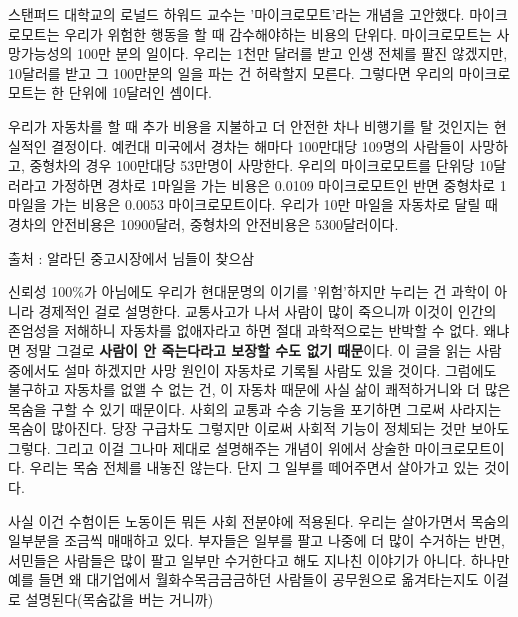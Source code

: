 \vspace{5mm}

스탠퍼드 대학교의 로널드 하워드 교수는 '마이크로모트'라는 개념을 고안했다.
마이크로모트는 우리가 위험한 행동을 할 때 감수해야하는 비용의 단위다.
마이크로모트는 사망가능성의 100만 분의 일이다.
우리는 1천만 달러를 받고 인생 전체를 팔진 않겠지만, 10달러를 받고 그 100만분의 일을 파는 건 허락할지 모른다.
그렇다면 우리의 마이크로모트는 한 단위에 10달러인 셈이다.
\vspace{5mm}

우리가 자동차를 할 때 추가 비용을 지불하고 더 안전한 차나 비행기를 탈 것인지는 현실적인 결정이다.
예컨대 미국에서 경차는 해마다 100만대당 109명의 사람들이 사망하고, 중형차의 경우 100만대당 53만명이 사망한다.
우리의 마이크로모트를 단위당 10달러라고 가정하면
경차로 1마일을 가는 비용은 0.0109 마이크로모트인 반면
중형차로  1마일을 가는 비용은 0.0053 마이크로모트이다.
우리가 10만 마일을 자동차로 달릴 때 경차의 안전비용은 10900달러, 중형차의 안전비용은 5300달러이다.
\vspace{5mm}

출처 : 알라딘 중고시장에서 님들이 찾으삼
\vspace{5mm}

신뢰성 100$\%$가 아님에도 우리가 현대문명의 이기를 '위험'하지만 누리는 건 과학이 아니라 경제적인 걸로 설명한다.
교통사고가 나서 사람이 많이 죽으니까 이것이 인간의 존엄성을 저해하니 자동차를 없애자라고 하면 절대 과학적으로는 반박할 수 없다.
왜냐면 정말 그걸로 \textbf{사람이 안 죽는다라고 보장할 수도 없기 때문}이다.
이 글을 읽는 사람 중에서도 설마 하겠지만 사망 원인이 자동차로 기록될 사람도 있을 것이다.
그럼에도 불구하고 자동차를 없앨 수 없는 건, 이 자동차 때문에 사실 삶이 쾌적하거니와 더 많은 목숨을 구할 수 있기 때문이다.
사회의 교통과 수송 기능을 포기하면 그로써 사라지는 목숨이 많아진다. 당장 구급차도 그렇지만 이로써 사회적 기능이 정체되는 것만 보아도 그렇다.
그리고 이걸 그나마 제대로 설명해주는 개념이 위에서 상술한 마이크로모트이다.
우리는 목숨 전체를 내놓진 않는다. 단지 그 일부를 떼어주면서 살아가고 있는 것이다.
\vspace{5mm}

사실 이건 수험이든 노동이든 뭐든 사회 전분야에 적용된다.
우리는 살아가면서 목숨의 일부분을 조금씩 매매하고 있다.
부자들은 일부를 팔고 나중에 더 많이 수거하는 반면,
서민들은 사람들은 많이 팔고 일부만 수거한다고 해도 지나친 이야기가 아니다.
하나만 예를 들면 왜 대기업에서 월화수목금금금하던 사람들이 공무원으로 옮겨타는지도 이걸로 설명된다(목숨값을 버는 거니까)
\vspace{5mm}

